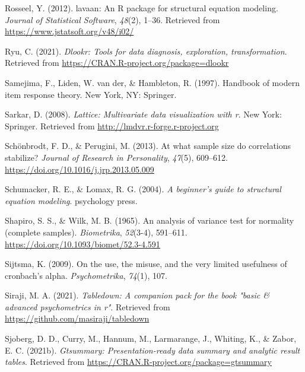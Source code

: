 \documentclass[
  english,
  man]{apa6}
\newlength{\cslhangindent}
\newlength{\cslentryspacingunit} %
\newenvironment{CSLReferences}[2] %
 {%
  \setlength{\parindent}{0pt}
  \ifodd #1
  \let\oldpar\par
  \def\par{\hangindent=\cslhangindent\oldpar}
  \fi
  \setlength{\parskip}{#2\cslentryspacingunit}
 }%
 {}
\begin{document}
\begin{CSLReferences}{1}{0}
\leavevmode{}%
Rosseel, Y. (2012). {lavaan}: An {R} package for structural equation modeling. \emph{Journal of Statistical Software}, \emph{48}(2), 1--36. Retrieved from \url{https://www.jstatsoft.org/v48/i02/}

\leavevmode{}%
Ryu, C. (2021). \emph{Dlookr: Tools for data diagnosis, exploration, transformation}. Retrieved from \url{https://CRAN.R-project.org/package=dlookr}

\leavevmode{}%
Samejima, F., Liden, W. van der, \& Hambleton, R. (1997). Handbook of modern item response theory. New York, NY: Springer.

\leavevmode{}%
Sarkar, D. (2008). \emph{Lattice: Multivariate data visualization with r}. New York: Springer. Retrieved from \url{http://lmdvr.r-forge.r-project.org}

\leavevmode{}%
Schönbrodt, F. D., \& Perugini, M. (2013). At what sample size do correlations stabilize? \emph{Journal of Research in Personality}, \emph{47}(5), 609--612. \url{https://doi.org/10.1016/j.jrp.2013.05.009}

\leavevmode{}%
Schumacker, R. E., \& Lomax, R. G. (2004). \emph{A beginner's guide to structural equation modeling}. psychology press.

\leavevmode{}%
Shapiro, S. S., \& Wilk, M. B. (1965). An analysis of variance test for normality (complete samples). \emph{Biometrika}, \emph{52}(3-4), 591--611. \url{https://doi.org/10.1093/biomet/52.3-4.591}

\leavevmode{}%
Sijtsma, K. (2009). On the use, the misuse, and the very limited usefulness of cronbach's alpha. \emph{Psychometrika}, \emph{74}(1), 107.

\leavevmode{}%
Siraji, M. A. (2021). \emph{Tabledown: A companion pack for the book "basic \& advanced psychometrics in r"}. Retrieved from \url{https://github.com/masiraji/tabledown}

\leavevmode{}%
Sjoberg, D. D., Curry, M., Hannum, M., Larmarange, J., Whiting, K., \& Zabor, E. C. (2021b). \emph{Gtsummary: Presentation-ready data summary and analytic result tables}. Retrieved from \url{https://CRAN.R-project.org/package=gtsummary}


\end{CSLReferences}
\end{document}

